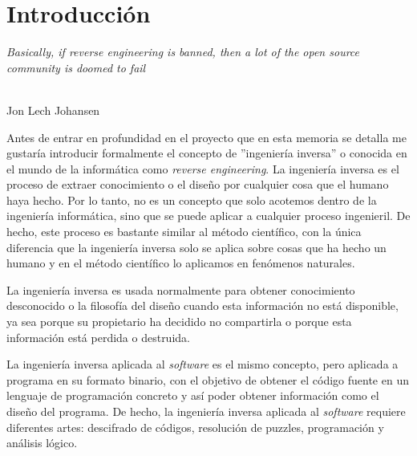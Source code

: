 \chapter{Introducción}
\label{cap:introducion}

\setcounter{page}{1}

\begin{flushright}
    \begin{minipage}[]{10cm}
        \emph{Basically, if reverse engineering is banned, then a lot of the open source community is doomed to fail}\\
    \end{minipage}\\

    Jon Lech Johansen \textit{}\\
\end{flushright}

\vspace{1cm}


Antes de entrar en profundidad en el proyecto que en esta memoria se detalla me gustaría introducir formalmente el concepto de ''ingeniería inversa'' o conocida en el mundo de la
informática como \textit{reverse engineering}. La ingeniería inversa es el proceso de extraer conocimiento o el diseño por cualquier cosa que el humano haya hecho. Por lo tanto,
no es un concepto que solo acotemos dentro de la ingeniería informática, sino que se puede aplicar a cualquier proceso ingenieril. De hecho, este proceso es bastante similar al
método científico, con la única diferencia que la ingeniería inversa solo se aplica sobre cosas que ha hecho un humano y en el método científico lo aplicamos en fenómenos
naturales.

La ingeniería inversa es usada normalmente para obtener conocimiento desconocido o la filosofía del diseño cuando esta información no está disponible, ya sea porque su propietario
ha decidido no compartirla o porque esta información está perdida o destruida. \cite{alma991003132729706711}

La ingeniería inversa aplicada al \textit{software} es el mismo concepto, pero aplicada a programa en su formato binario, con el objetivo de obtener el código fuente en un lenguaje
de programación concreto y así poder obtener información como el diseño del programa. De hecho, la ingeniería inversa aplicada al \textit{software} requiere diferentes artes:
descifrado de códigos, resolución de puzzles, programación y análisis lógico.


